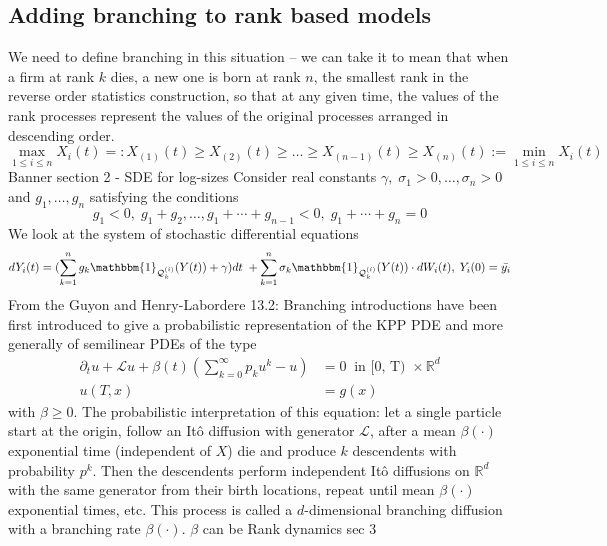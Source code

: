 \documentclass{article}
\begin{document}
\subsection{Adding branching to rank based models}
We need to define branching in this situation -- we can take it to mean that when a firm at rank $k$ dies, a new one is born at rank $n$, the smallest rank in the reverse order statistics construction, so that at any given time, the values of the rank processes represent the values of the original processes arranged in descending order. 
\begin{equation*}
    \max_{1 \leq i \leq n}X_i(t) =: X_{(1)}(t) \geq X_{(2)}(t) \geq \ldots \geq X_{(n-1)}(t) \geq X_{(n)}(t) := \min_{1 \leq i \leq n}X_i(t)
\end{equation*}
Banner section 2 - SDE for log-sizes
Consider real constants $\gamma, \; \sigma_1 > 0, \ldots, \sigma_n > 0$ and $g_1, \ldots, g_n$ satisfying the conditions 
\begin{equation*}
    g_1 <0, \; g_1 + g_2, \ldots, g_1 + \cdots + g_{n-1} <0 , \; g_1 + \cdots + g_n = 0
\end{equation*}
We look at the system of stochastic differential equations 
\begin{equation*}
    dY_i(t) = (\sum_{k=1}^n g_k \mathbbm{1}_{\mathcal{Q}_k^{(i)}}(Y(t))+ \gamma)dt \; + \sum_{k=1}^n\sigma_k \mathbbm{1}_{\mathcal{Q}_k^{(i)}}(Y(t)) \cdot dW_i(t), \; Y_i(0) = \bar{y_i}
\end{equation*}
From the Guyon and Henry-Labordere 13.2: Branching introductions have been first introduced to give a probabilistic representation of the KPP PDE and more generally of semilinear PDEs of the type
\begin{align*}
    \partial_tu + \mathcal{L}u+ \beta (t) (\sum_{k=0}^\infty p_ku^k - u) &= 0 \; \; \text{in [0, T) } \times \mathbb{R}^d \\
    u(T, x) &= g(x)
\end{align*}
with $\beta \geq 0 $. The probabilistic interpretation of this equation: let a single particle start at the origin, follow an It\^{o} diffusion with generator $\mathcal{L}$, after a mean $\beta(\cdot)$ exponential time (independent of $X$) die and produce $k$ descendents with probability $p^k$. Then the descendents perform independent It\^{o} diffusions on $\mathbb{R}^d$ with the same generator from their birth locations, repeat until mean $\beta(\cdot)$ exponential times, etc. This process is called a $d$-dimensional branching diffusion with a branching rate $\beta(\cdot)$. $\beta$ can be 
Rank dynamics sec 3
\end{document}
